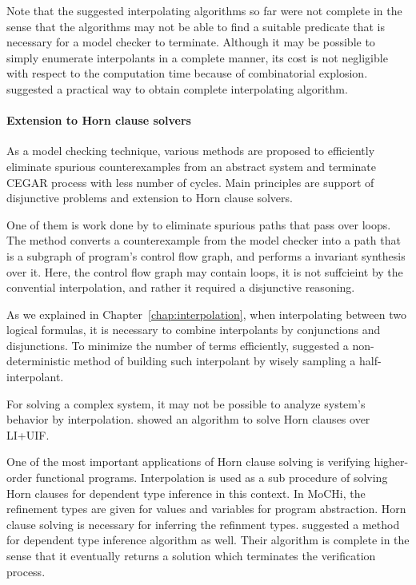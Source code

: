 Note that the suggested interpolating algorithms so far were not
complete in the sense that the algorithms may not be able to find a
suitable predicate that is necessary for a model checker to terminate.
Although it may be possible to simply enumerate interpolants in a
complete manner, its cost is not negligible with respect to the
computation time because of combinatorial explosion.
\cite{conf/tacas/JhalaM06} suggested a practical way to
obtain complete interpolating algorithm.

\paragraph{Extension to Horn clause solvers}
As a model checking technique, various methods are proposed to
efficiently eliminate spurious counterexamples from an abstract system
and terminate CEGAR process with less number of cycles.  Main
principles are support of disjunctive problems and extension to Horn
clause solvers.

One of them is work done by \cite{conf/pldi/BeyerHMR07} to eliminate
spurious paths that pass over loops.  The method converts a
counterexample from the model checker into a path that is a subgraph
of program's control flow graph, and performs a invariant synthesis
over it.  Here, the control flow graph may contain loops, it is not
suffcieint by the convential interpolation, and rather it required a
disjunctive reasoning.

As we explained in Chapter~\ref{chap:interpolation}, when
interpolating between two logical formulas, it is necessary to combine
interpolants by conjunctions and disjunctions.  To minimize the number
of terms efficiently, \cite{conf/cav/AlbarghouthiM13} suggested a
non-deterministic method of building such interpolant by wisely
sampling a half-interpolant.

For solving a complex system, it may not be possible to analyze
system's behavior by interpolation.  \cite{conf/aplas/GuptaPR11}
showed an algorithm to solve Horn clauses over LI+UIF.

One of the most important applications of Horn clause solving is
verifying higher-order functional programs.  Interpolation is used as
a sub procedure of solving Horn clauses for dependent type
inference \cite{conf/ppdp/UnnoK09, conf/pepm/SatoUK13} in this
context. In MoCHi, the refinement types are given for values and
variables for program abstraction.  Horn clause solving is necessary
for inferring the refinment types.  \cite{conf/popl/Terauchi10}
suggested a method for dependent type inference algorithm as
well. Their algorithm is complete in the sense that it eventually
returns a solution which terminates the verification process.

